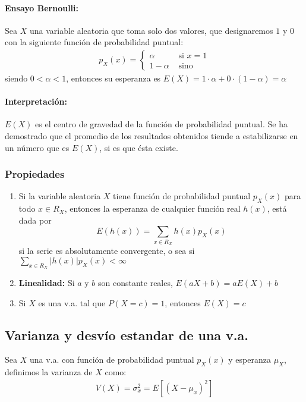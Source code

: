 	\paragraph{Ensayo Bernoulli:} Sea $X$ una variable aleatoria que toma solo dos valores, que designaremos $1$ y $0$ con la siguiente función de probabilidad puntual:
	\begin{align*}
        p_X(x) = \left\{
        \begin{array}{cc}
            \alpha & \text{ si } x = 1 \\
            1-\alpha & \text{ sino}
        \end{array}
        \right.
	\end{align*}
	siendo $0 <\alpha < 1$, entonces su esperanza es $E(X) = 1\cdot\alpha + 0\cdot(1-\alpha) = \alpha$
	
	\paragraph{Interpretación:} $E(X)$ es el centro de gravedad de la función de probabilidad puntual. Se ha demostrado que el promedio de los resultados obtenidos tiende a estabilizarse en un número que es $E(X)$, si es que ésta existe.
	\subsubsection{Propiedades}
	\begin{enumerate}
	\item Si la variable aleatoria $X$ tiene función de probabilidad puntual $p_X(x)$ para todo $x\in R_X$, entonces la esperanza de cualquier función real $h(x)$, está dada por
	$$E(h(x)) = \sum_{x\in R_X} h(x)p_X(x)$$
	si la serie es absolutamente convergente, o sea si $\sum_{x\in R_X} |h(x)|p_X(x) < \infty$
	
	\item \textbf{Linealidad:} Si $a$ y $b$ son constante reales, $E(aX + b) = aE(X) + b$
	\item Si $X$ es una v.a. tal que $P(X=c)=1$, entonces $E(X) = c$

	\end{enumerate}
	
	\subsection{Varianza y desvío estandar de una v.a.}
	Sea $X$ una v.a. con función de probabilidad puntual $p_X(x)$ y esperanza $\mu_X$, definimos la varianza de $X$ como:
	\begin{align*}
	V(X) = \sigma_x^2 = E\left[(X-\mu_x)^2\right]
	\end{align*}
	
